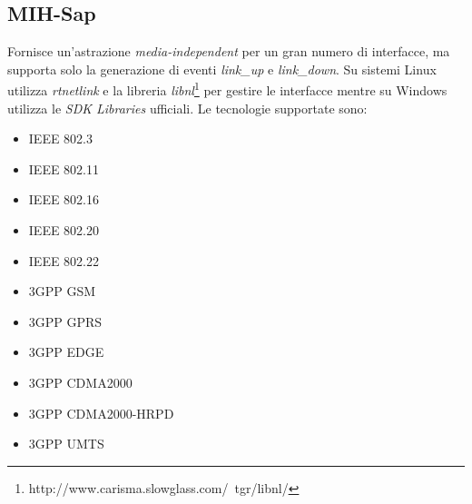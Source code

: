 \subsection{MIH-Sap}
Fornisce un'astrazione {\em media-independent} per un gran numero di interfacce, ma supporta solo la generazione di eventi {\em link\_up} e {\em link\_down}. Su sistemi Linux utilizza {\em rtnetlink} e la libreria {\em libnl}\footnote{http://www.carisma.slowglass.com/~tgr/libnl/} per gestire le interfacce mentre su Windows utilizza le {\em SDK Libraries} ufficiali.
Le tecnologie supportate sono:
\begin{itemize}
\item IEEE 802.3
\item IEEE 802.11
\item IEEE 802.16
\item IEEE 802.20
\item IEEE 802.22
\item 3GPP GSM
\item 3GPP GPRS
\item 3GPP EDGE
\item 3GPP CDMA2000
\item 3GPP CDMA2000-HRPD
\item 3GPP UMTS
\end{itemize}

